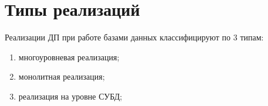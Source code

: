 \section{Типы реализаций}
Реализации ДП при работе базами данных классифицируют по 3 типам: 
\begin{enumerate}[label*=---]
	\item многоуровневая реализация;
	\item монолитная реализация;
	\item реализация на уровне СУБД;
\end{enumerate}


